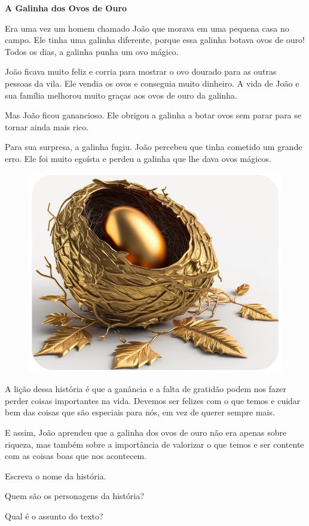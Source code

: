 \begin{myquote}
\textbf{A Galinha dos Ovos de Ouro}

Era uma vez um homem chamado João que morava em uma pequena casa no campo. Ele tinha uma galinha diferente, porque essa galinha botava ovos de ouro! Todos os dias, a galinha punha um ovo mágico.

João ficava muito feliz e corria para mostrar o ovo dourado para as outras pessoas da vila. Ele vendia os ovos e conseguia muito dinheiro. A vida de João e sua família melhorou muito graças aos ovos de ouro da galinha.

Mas João ficou ganancioso. Ele obrigou a galinha a botar ovos sem parar para se tornar ainda mais rico.

Para sua surpresa, a galinha fugiu. João percebeu que tinha cometido um grande erro. Ele foi muito egoísta e perdeu a galinha que lhe dava ovos mágicos.

\begin{figure}[H]
\centering
\includegraphics[width=.8\textwidth]{media/image191.png}
\end{figure}

A lição dessa história é que a ganância e a falta de gratidão podem nos fazer perder coisas importantes na vida. Devemos ser felizes com o que temos e cuidar bem das coisas que são especiais para nós, em vez de querer sempre mais.

E assim, João aprendeu que a galinha dos ovos de ouro não era apenas sobre riqueza, mas também sobre a importância de valorizar o que temos e ser contente com as coisas boas que nos acontecem.
\end{myquote}

\begin{escolha}
\item Escreva o nome da história.\\

\item Quem são os personagens da história?\\

\item Qual é o assunto do texto?\\
\end{escolha}

